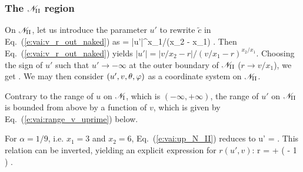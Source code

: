 \subsubsection{The $\mathscr{N}_{\rm II}$ region}

On $\mathscr{N}_{\rm II}$, let us introduce the parameter $u'$ to rewrite
$\tilde{c}$ in Eq.~(\ref{e:vai:v_r_out_naked}) as
\be \label{e:vai:def_up_tilde_c}
     = |u'|^{x_1/(x_2 - x_1)} .
\ee
Then Eq.~(\ref{e:vai:v_r_out_naked}) yields $|u'| = |v/x_2 - r| / (v/x_1 - r)^{x_2/x_1}$.
Choosing the sign of $u'$ such that $u'\to -\infty$ at the outer boundary of
$\mathscr{N}_{\rm II}$ ($r\to v/x_1$), we get
\be \label{e:vai:up_N_II}
    .
\ee
We may then consider $(u',v,\theta,\varphi)$ as a coordinate system on $\mathscr{N}_{\rm II}$.

\begin{remark}
Contrary to the range of $u$ on $\mathscr{N}_{\rm I}$, which is $(-\infty,+\infty)$,
the range of $u'$ on $\mathscr{N}_{\rm II}$ is bounded from above by a function
of $v$, which is given by Eq.~(\ref{e:vai:range_v_uprime}) below.
\end{remark}

\begin{example}
For $\alpha=1/9$, i.e. $x_1 = 3$ and $x_2 = 6$,
Eq.~(\ref{e:vai:up_N_II}) reduces to
\be \label{e:vai:up_v_r_alp1o9}
    u' =   .
\ee
This relation can be inverted, yielding  an explicit expression for $r(u', v)$:
\be \label{e:vai:r_up_v_alp1o9}
    r =  +  \left(  - 1 \right) .
\ee
\end{example}

